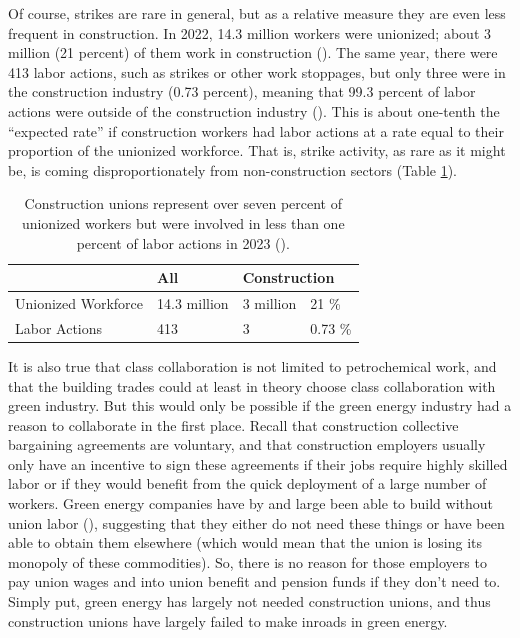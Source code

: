 \documentclass[12pt]{article}
\begin{document}
Of course, strikes are rare in general, but as a relative measure they are even less frequent in construction. In 2022, 14.3 million workers were unionized; about 3 million (21 percent) of them work in construction (\cite{blsUnionMembersSummary2024}). The same year, there were 413 labor actions, such as strikes or other work stoppages, but only three were in the construction industry (0.73 percent), meaning that 99.3 percent of labor actions were outside of the construction industry (\cite{ilrschoolILRLaborAction}). This is about one-tenth the “expected rate” if construction workers had labor actions at a rate equal to their proportion of the unionized workforce. That is, strike activity, as rare as it might be, is coming disproportionately from non-construction sectors (Table \ref{tab:strikes}).

\begin{table}[b]
\centering
\begin{tabular}{llll}
                    & All            & \multicolumn{2}{l}{Construction} \\ \hline
Unionized Workforce & 14.3 million	& 3 million				& 21 \%     \\
Labor Actions       		& 413				& 3							& 0.73 \%    
\end{tabular}
\captionsetup{justification=centering, singlelinecheck=false, margin=2cm} 
\caption[Labor Actions]{Construction unions represent over seven percent of unionized workers but were involved in less than one percent of labor actions in 2023 (\cite{ilrschoolILRLaborAction}).}
\label{tab:strikes}
\end{table}

It is also true that class collaboration is not limited to petrochemical work, and that the building trades could at least in theory choose class collaboration with green industry. But this would only be possible if the green energy industry had a reason to collaborate in the first place. Recall that construction collective bargaining agreements are voluntary, and that construction employers usually only have an incentive to sign these agreements if their jobs require highly skilled labor or if they would benefit from the quick deployment of a large number of workers. Green energy companies have by and large been able to build without union labor (\cite{scheiberBuildingSolarFarms2021}), suggesting that they either do not need these things or have been able to obtain them elsewhere (which would mean that the union is losing its monopoly of these commodities). So, there is no reason for those employers to pay union wages and into union benefit and pension funds if they don’t need to. Simply put, green energy has largely not needed construction unions, and thus construction unions have largely failed to make inroads in green energy.
\end{document}
